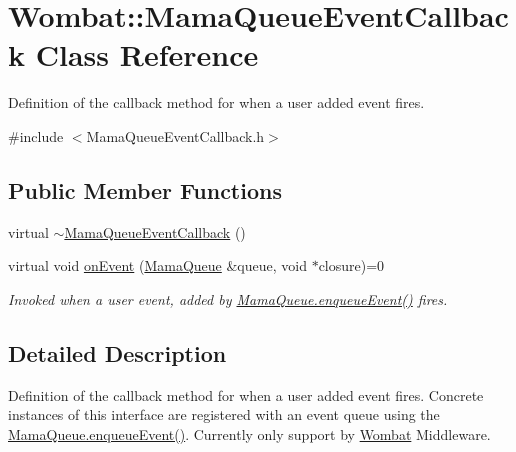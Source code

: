 \hypertarget{classWombat_1_1MamaQueueEventCallback}{
\section{Wombat::MamaQueueEventCallback Class Reference}
\label{classWombat_1_1MamaQueueEventCallback}
}


Definition of the callback method for when a user added event fires.  


{\ttfamily \#include $<$MamaQueueEventCallback.h$>$}\subsection*{Public Member Functions}
\begin{DoxyCompactItemize}
\item 
virtual \hyperlink{classWombat_1_1MamaQueueEventCallback_acfe9bf6b75e5c77972529963517eee8b}{$\sim$MamaQueueEventCallback} ()
\item 
virtual void \hyperlink{classWombat_1_1MamaQueueEventCallback_ae5d78bf4717b97e7d72858a30e2a3233}{onEvent} (\hyperlink{classWombat_1_1MamaQueue}{MamaQueue} \&queue, void $\ast$closure)=0
\begin{DoxyCompactList}\small\item\em Invoked when a user event, added by {\ttfamily \hyperlink{classWombat_1_1MamaQueue_a8b1a038741f3d3c5cd3bcea8708003c7}{MamaQueue.enqueueEvent()}} fires. \item\end{DoxyCompactList}\end{DoxyCompactItemize}


\subsection{Detailed Description}
Definition of the callback method for when a user added event fires. Concrete instances of this interface are registered with an event queue using the {\ttfamily \hyperlink{classWombat_1_1MamaQueue_a8b1a038741f3d3c5cd3bcea8708003c7}{MamaQueue.enqueueEvent()}}. Currently only support by \hyperlink{namespaceWombat}{Wombat} Middleware. 

